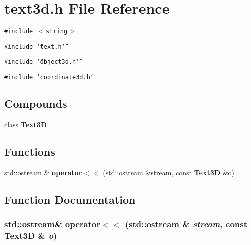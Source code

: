 \section{text3d.h File Reference}
\label{text3d_8h}
{\tt \#include $<$string$>$}\par
{\tt \#include \char`\"{}text.h\char`\"{}}\par
{\tt \#include \char`\"{}object3d.h\char`\"{}}\par
{\tt \#include \char`\"{}coordinate3d.h\char`\"{}}\par
\subsection*{Compounds}
\begin{CompactItemize}
\item 
class {\bf Text3D}
\end{CompactItemize}
\subsection*{Functions}
\begin{CompactItemize}
\item 
std::ostream \& {\bf operator$<$$<$} (std::ostream \&stream, const {\bf Text3D} \&o)
\end{CompactItemize}


\subsection{Function Documentation}
\subsubsection{\setlength{\rightskip}{0pt plus 5cm}std::ostream\& operator$<$$<$ (std::ostream \& {\em stream}, const {\bf Text3D} \& {\em o})\hspace{0.3cm}{\tt  [inline]}}\label{text3d_8h_a0}


